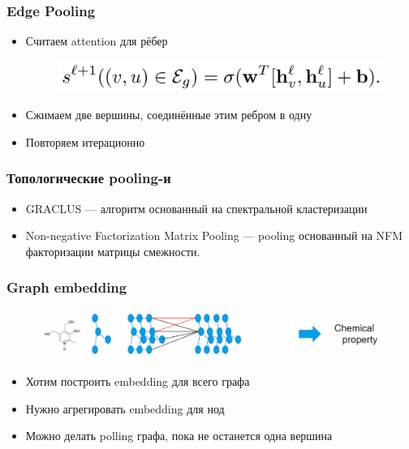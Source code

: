 \documentclass{beamer}
\begin{document}
\begin{frame}
\frametitle{Edge Pooling}
\begin{itemize}
	\item Считаем attention для рёбер
	\begin{figure}
		\includegraphics[width=0.7\columnwidth]{edge_pooling.png}
	\end{figure}
	\item Сжимаем две вершины, соединённые этим ребром в одну
	\item Повторяем итерационно
\end{itemize}
\end{frame}

\begin{frame}
\frametitle{Топологические pooling-и}
\begin{itemize}
	\item GRACLUS --- алгоритм основанный на спектральной кластеризации
	\item Non-negative Factorization Matrix Pooling --- pooling основанный на NFM факторизации матрицы смежности.
\end{itemize}
\end{frame}

\begin{frame}
\frametitle{Graph embedding}
\begin{figure}
	\includegraphics[width=\columnwidth]{moleculs.png}
\end{figure}
\begin{itemize}
	\item Хотим построить embedding для всего графа
	\item Нужно агрегировать embedding для нод
	\item Можно делать polling графа, пока не останется одна вершина
\end{itemize}
\end{frame}
\end{document}

